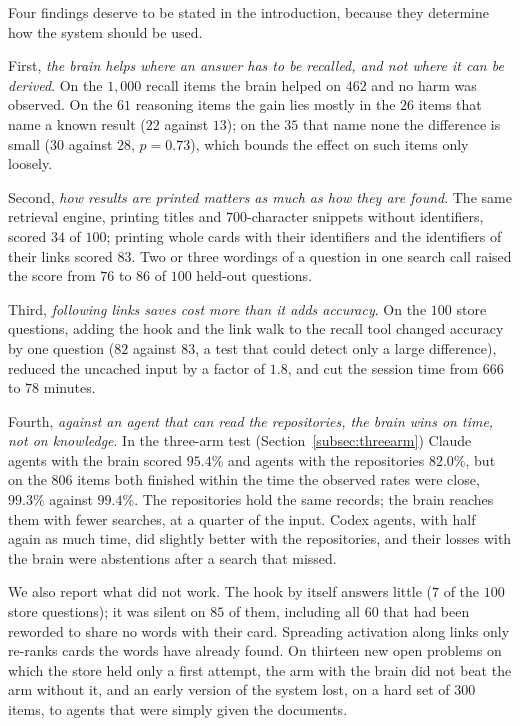 Four findings deserve to be stated in the introduction, because they determine how the system should be used.

First, \emph{the brain helps where an answer has to be recalled, and not where it can be derived}. On the $1{,}000$ recall items the brain helped on $462$ and no harm was observed. On the $61$ reasoning items the gain lies mostly in the $26$ items that name a known result ($22$ against $13$); on the $35$ that name none the difference is small ($30$ against $28$, $p=0.73$), which bounds the effect on such items only loosely.

Second, \emph{how results are printed matters as much as how they are found}. The same retrieval engine, printing titles and $700$-character snippets without identifiers, scored $34$ of $100$; printing whole cards with their identifiers and the identifiers of their links scored $83$. Two or three wordings of a question in one search call raised the score from $76$ to $86$ of $100$ held-out questions.

Third, \emph{following links saves cost more than it adds accuracy}. On the $100$ store questions, adding the hook and the link walk to the recall tool changed accuracy by one question ($82$ against $83$, a test that could detect only a large difference), reduced the uncached input by a factor of $1.8$, and cut the session time from $666$ to $78$ minutes.

Fourth, \emph{against an agent that can read the repositories, the brain wins on time, not on knowledge}. In the three-arm test (Section~\ref{subsec:threearm}) Claude agents with the brain scored $95.4\%$ and agents with the repositories $82.0\%$, but on the $806$ items both finished within the time the observed rates were close, $99.3\%$ against $99.4\%$. The repositories hold the same records; the brain reaches them with fewer searches, at a quarter of the input. Codex agents, with half again as much time, did slightly better with the repositories, and their losses with the brain were abstentions after a search that missed.

We also report what did not work. The hook by itself answers little ($7$ of the $100$ store questions); it was silent on $85$ of them, including all $60$ that had been reworded to share no words with their card. Spreading activation along links only re-ranks cards the words have already found. On thirteen new open problems on which the store held only a first attempt, the arm with the brain did not beat the arm without it, and an early version of the system lost, on a hard set of $300$ items, to agents that were simply given the documents.

